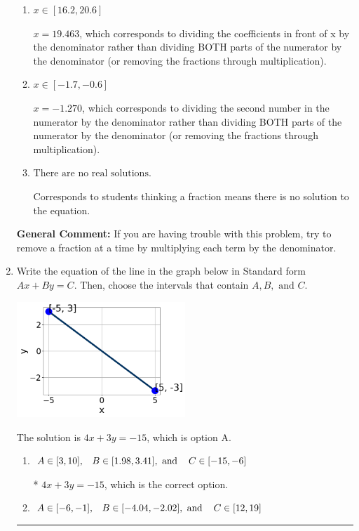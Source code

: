 \documentclass{extbook}[14pt]
\newcommand{\litem}[1]{\item #1

\rule{\textwidth}{0.4pt}}
\begin{document}
\begin{enumerate}
{\begin{enumerate}[label=\Alph*.]
 $x = 1.561$, which corresponds to not distributing the negative in front of the second fraction.
\item \( x \in [16.2, 20.6] \)

 $x = 19.463$, which corresponds to dividing the coefficients in front of x by the denominator rather than dividing BOTH parts of the numerator by the denominator (or removing the fractions through multiplication).
\item \( x \in [-1.7, -0.6] \)

 $x = -1.270$, which corresponds to dividing the second number in the numerator by the denominator rather than dividing BOTH parts of the numerator by the denominator (or removing the fractions through multiplication).
\item \( \text{There are no real solutions.} \)

Corresponds to students thinking a fraction means there is no solution to the equation.
\end{enumerate}

\textbf{General Comment:} If you are having trouble with this problem, try to remove a fraction at a time by multiplying each term by the denominator.
}
\litem{
Write the equation of the line in the graph below in Standard form $Ax+By=C$. Then, choose the intervals that contain $A, B, \text{ and } C$.

\begin{center}
    \includegraphics[width=0.5\textwidth]{../Figures/linearGraphToStandardB.png}
\end{center}



The solution is \( 4x + 3y = -15 \), which is option A.\begin{enumerate}[label=\Alph*.]
\item \( A \in [3, 10], \hspace{3mm} B \in [1.98, 3.41], \text{ and } \hspace{3mm} C \in [-15, -6] \)

* $4x + 3y = -15$, which is the correct option.
\item \( A \in [-6, -1], \hspace{3mm} B \in [-4.04, -2.02], \text{ and } \hspace{3mm} C \in [12, 19] \)


\end{enumerate}}
\end{enumerate}
\end{document}
